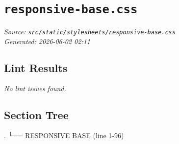 
\section{\texttt{responsive-base.css}}
\textit{Source: \texttt{src/static/stylesheets/responsive-base.css}} \\
\textit{Generated: 2026-06-02 02:11} \\

\subsection{Lint Results}
\textit{No lint issues found.} \\

\subsection{Section Tree}
\begingroup
\linespread{0.9}\selectfont
\begin{verbnobox}[\FiraCode]
.
└── RESPONSIVE BASE  (line 1-96)
\end{verbnobox}
\endgroup
